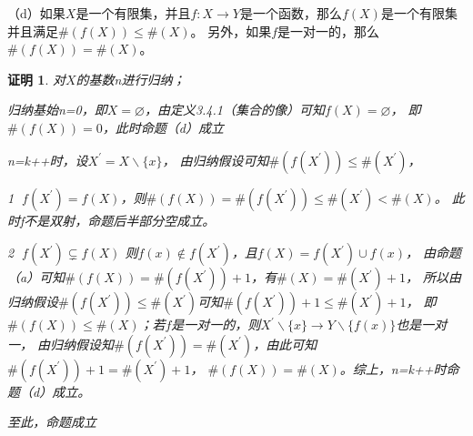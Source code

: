 \documentclass{article}
\theoremstyle{mystyle}
\theoremstyle{zproofstyle}
\newtheorem*{zproof}{证明}
\begin{document}
（d）如果$X$是一个有限集，并且$f: X \rightarrow Y$是一个函数，那么$f(X)$是一个有限集并且满足$\#(f(X)) \leq \#(X)$。
另外，如果$f$是一对一的，那么$\#(f(X)) = \#(X)$。

\begin{zproof}
    对$X$的基数n进行归纳；

    归纳基始n=0，即$X = \varnothing$，由定义3.4.1（集合的像）可知$f(X) = \varnothing$，
    即$\#(f(X)) = 0$，此时命题（d）成立
    
    n=k++时，设$X^\prime = X \backslash \{x\}$，
    由归纳假设可知$\#(f(X^\prime)) \leq \#(X^\prime)$，

    \textcircled{1} $f(X^\prime) = f(X)$，则$\#(f(X)) =\#(f(X^\prime)) \leq \#(X^\prime) < \#(X)$。
    此时f不是双射，命题后半部分空成立。

    \textcircled{2} $f(X^\prime) \subsetneq  f(X)$
    则$f(x) \not \in f(X^\prime)$，且$f(X) = f(X^\prime) \cup f(x)$，
    由命题（a）可知$\#(f(X))=\#(f(X^\prime)) + 1$，有$\#(X) = \#(X^\prime) + 1$，
    所以由归纳假设$\#(f(X^\prime)) \leq \#(X^\prime)$可知$\#(f(X^\prime)) + 1 \leq \#(X^\prime) + 1$，
    即$\#(f(X)) \leq \#(X)$；若$f$是一对一的，则$X^\prime \backslash \{x\} \rightarrow Y \backslash \{f(x)\}$也是一对一，
    由归纳假设知$\#(f(X^\prime)) = \#(X^\prime)$，由此可知$\#(f(X^\prime)) + 1 = \#(X^\prime) + 1$，
    $\#(f(X)) = \#(X)$。综上，n=k++时命题（d）成立。

    至此，命题成立
\end{zproof}
\end{document}
